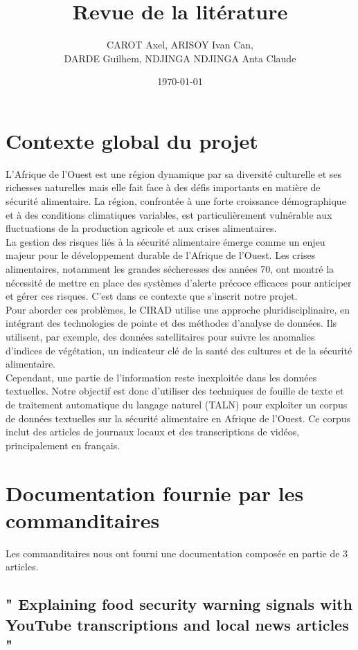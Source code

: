 \documentclass{article}
\title{Revue de la litérature}
\author{CAROT Axel, ARISOY Ivan Can, \\ DARDE Guilhem, NDJINGA NDJINGA Anta Claude}
\date{\today}
\begin{document}
\maketitle

\section{Contexte global du projet}
L'Afrique de l'Ouest est une région dynamique par sa diversité culturelle et ses richesses naturelles mais elle fait face à des défis importants en matière de sécurité alimentaire. La région, confrontée à une forte croissance démographique et à des conditions climatiques variables, est particulièrement vulnérable aux fluctuations de la production agricole et aux crises alimentaires. \\

La gestion des risques liés à la sécurité alimentaire émerge comme un enjeu majeur pour le développement durable de l'Afrique de l'Ouest. Les crises alimentaires, notamment les grandes sécheresses des années 70, ont montré la nécessité de mettre en place des systèmes d’alerte précoce efficaces pour anticiper et gérer ces risques. C’est dans ce contexte que s’inscrit notre projet. \\

Pour aborder ces problèmes, le CIRAD utilise une approche pluridisciplinaire, en intégrant des technologies de pointe et des méthodes d'analyse de données. Ils utilisent, par exemple, des données satellitaires pour suivre les anomalies d’indices de végétation, un indicateur clé de la santé des cultures et de la sécurité alimentaire. \\

Cependant, une partie de l'information reste inexploitée dans les données textuelles. Notre objectif est donc d'utiliser des techniques de fouille de texte et de traitement automatique du langage naturel (TALN) pour exploiter un corpus de données textuelles sur la sécurité alimentaire en Afrique de l'Ouest. Ce corpus inclut des articles de journaux locaux et des transcriptions de vidéos, principalement en français.

\section{Documentation fournie par les commanditaires}
Les commanditaires nous ont fourni une documentation composée en partie de 3 articles.

\subsection{" Explaining food security warning signals with YouTube transcriptions and local news articles "}
\end{document}
